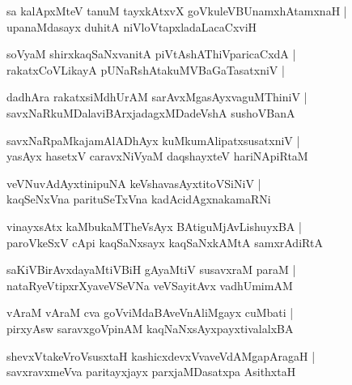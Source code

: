 \documentclass[twoside,12pt,openright]{book}
\newcounter{shloka}[chapter]
\begin{document}
\begin{shloka}%
sa kalApxMteV tanuM tayxkAtxvX goVkuleVBUnamxhAtamxnaH |\\
upanaMdasayx duhitA niVloVtapxladaLacaCxviH 
\end{shloka}

\begin{shloka}%
soVyaM shirxkaqSaNxvanitA piVtAshAThiVparicaCxdA |\\
rakatxCoVLikayA pUNaRshAtakuMVBaGaTasatxniV |\\
\end{shloka}

\begin{shloka}%
dadhAra rakatxsiMdhUrAM sarAvxMgasAyxvaguMThiniV |\\
savxNaRkuMDalaviBArxjadagxMDadeVshA sushoVBanA 
\end{shloka}

\begin{shloka}%
savxNaRpaMkajamAlADhAyx kuMkumAlipatxsusatxniV |\\
yasAyx hasetxV caravxNiVyaM daqshayxteV hariNApiRtaM
\end{shloka}

\begin{shloka}%
veVNuvAdAyxtinipuNA keVshavasAyxtitoVSiNiV |\\
kaqSeNxVna parituSeTxVna kadAcidAgxnakamaRNi
\end{shloka}

\begin{shloka}%
vinayxsAtx kaMbukaMTheVsAyx BAtiguMjAvLishuyxBA |\\
paroVkeSxV cApi kaqSaNxsayx kaqSaNxkAMtA samxrAdiRtA 
\end{shloka}

\begin{shloka}%
saKiVBirAvxdayaMtiVBiH gAyaMtiV susavxraM paraM |\\
nataRyeVtipxrXyaveVSeVNa veVSayitAvx vadhUmimAM 
\end{shloka}

\begin{shloka}%
vAraM vAraM cva goVviMdaBAveVnAliMgayx cuMbati |\\
pirxyAsw saravxgoVpinAM kaqNaNxsAyxpayxtivalalxBA 
\end{shloka}

\begin{shloka}%
shevxVtakeVroVsusxtaH kashicxdevxVvaveVdAMgapAragaH |\\
savxravxmeVva paritayxjayx parxjaMDasatxpa AsithxtaH 
\end{shloka}
\end{document}
